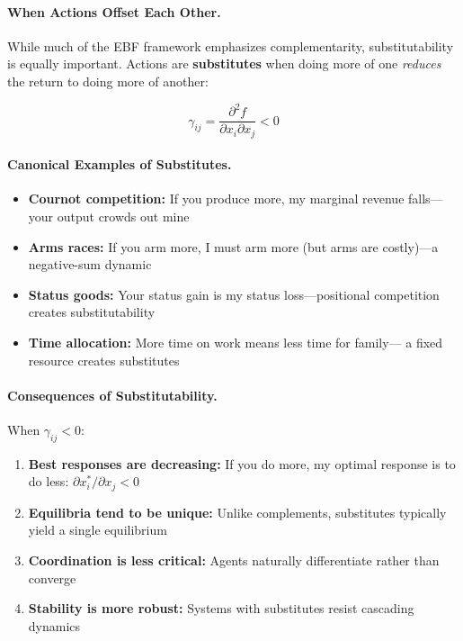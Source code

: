 \paragraph{When Actions Offset Each Other.}
While much of the EBF framework emphasizes complementarity, substitutability
is equally important. Actions are \textbf{substitutes} when doing more of one
\textit{reduces} the return to doing more of another:

\begin{equation}
\gamma_{ij} = \frac{\partial^2 f}{\partial x_i \partial x_j} < 0
\label{eq:substitutes-detailed}
\end{equation}

\paragraph{Canonical Examples of Substitutes.}
\begin{itemize}
    \item \textbf{Cournot competition:} If you produce more, my marginal revenue
          falls---your output crowds out mine
    \item \textbf{Arms races:} If you arm more, I must arm more (but arms are
          costly)---a negative-sum dynamic
    \item \textbf{Status goods:} Your status gain is my status loss---positional
          competition creates substitutability
    \item \textbf{Time allocation:} More time on work means less time for family---
          a fixed resource creates substitutes
\end{itemize}

\paragraph{Consequences of Substitutability.}
When $\gamma_{ij} < 0$:
\begin{enumerate}
    \item \textbf{Best responses are decreasing:} If you do more, my optimal
          response is to do less: $\partial x_i^* / \partial x_j < 0$
    \item \textbf{Equilibria tend to be unique:} Unlike complements, substitutes
          typically yield a single equilibrium
    \item \textbf{Coordination is less critical:} Agents naturally differentiate
          rather than converge
    \item \textbf{Stability is more robust:} Systems with substitutes resist
          cascading dynamics
\end{enumerate}

